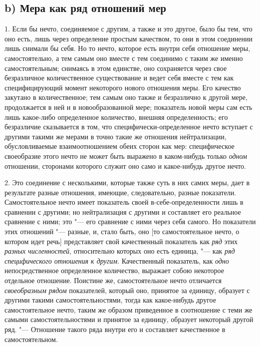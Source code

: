 \subsection[b) Мера как ряд отношений мер]{b) Мера как ряд отношений мер}
1. Если бы нечто, соединяемое с другим, а также
и это другое, было бы тем, что оно есть, лишь через определение простым
качеством, то они в этом соединении лишь снимали бы себя. Но то нечто,
которое есть внутри себя отношение меры, самостоятельно, а тем самым оно
вместе с тем соединимо с таким же именно самостоятельным; снимаясь в этом
единстве, оно сохраняется через свое безразличное количественное
существование и ведет себя вместе с тем как специфицирующий момент
некоторого нового отношения меры. Его качество закутано в количественное;
тем самым оно также и безразлично к другой мере, продолжается в ней и в
новообразованной мере; показатель новой меры сам есть лишь какое-либо
определенное количество, внешняя определенность; его безразличие
сказывается в том, что специфически-определенное нечто вступает с другими
такими же мерами в точно такие же отношения нейтрализации, обусловливаемые
взаимоотношением обеих сторон как мер: специфическое своеобразие этого
нечто не может быть выражено в каком-нибудь только
{\em одном} отношении, сторонами которого служит оно
само и какое-нибудь другое нечто.

2. Это соединение с несколькими, которые также суть в них самих меры, дает в
результате разные отношения, имеющие, следовательно, разные показатели.
Самостоятельное нечто имеет показатель своей в-себе-определенности лишь в
сравнении с другими; но нейтрализация с другими и составляет его реальное
сравнение с ними; это "--- его сравнение с ними через себя самого. Но
показатели этих отношений "--- разные, и, стало быть, оно [то самостоятельное
нечто, о котором идет речь] представляет свой качественный показатель как
{\em ряд} этих {\em разных
численностей}, относительно которых оно есть единица, "--- как
{\em ряд специфического отношения к другим}.
Качественный показатель, как {\em одно}
непосредственное определенное количество, выражает собою некоторое
отдельное отношение. Поистине же, самостоятельное нечто отличается
{\em своеобразным рядом} показателей, который оно,
принятое за единицу, образует с другими такими самостоятельностями, тогда
как какое-нибудь другое самостоятельное нечто, таким же образом приведенное
в соотношение с теми же самыми самостоятельностями и принятое за единицу,
образует некоторый другой ряд. "--- Отношение такого ряда внутри его и
составляет качественное в самостоятельном.

